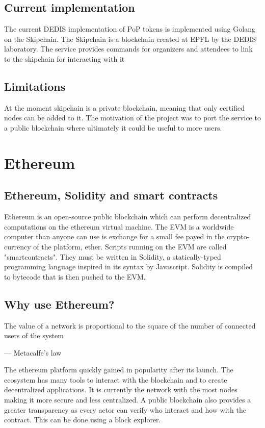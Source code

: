 \documentclass[11pt, a4paper, twoside, openright]{book} %
\begin{document}
\subsection{Current implementation}
The current DEDIS implementation of PoP tokens is implemented using Golang on the Skipchain. The Skipchain is a blockchain created at EPFL by the DEDIS laboratory. The service provides commands for organizers and attendees to link to the skipchain for interacting with it 

\subsection{Limitations}
At the moment skipchain is a private blockchain, meaning that only certified nodes can be added to it. The motivation of the project was to port the service to a public blockchain where ultimately it could be useful to more users. 

\section{Ethereum}

\subsection{Ethereum, Solidity and smart contracts}
 Ethereum is an open-source public blockchain which can perform decentralized computations on the ethereum virtual machine. The EVM is a worldwide computer than anyone can use is exchange for a small fee payed in the crypto-currency of the platform, ether. Scripts running on the EVM are called "smartcontracts". They must be written in Solidity, a statically-typed programming language inspired in its syntax by Javascript. Solidity is compiled to bytecode that is then pushed to the EVM. 


\subsection{Why use Ethereum?}

\epigraph{The value of a network is proportional to the square of the number of connected users of the system}
{--- \textup{Metacalfe's law}}

The ethereum platform quickly gained in popularity after its launch. The ecosystem has many tools to interact with the blockchain and to create decentralized applications. It is currently the network with the most nodes making it more secure and less centralized. A public blockchain also provides a greater transparency as every actor can verify who interact and how with the contract. This can be done using a block explorer. 
\end{document}
